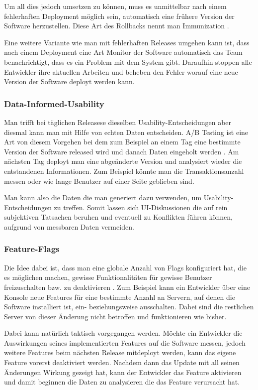 Um all dies jedoch umsetzen zu können, muss es unmittelbar nach einem fehlerhaften Deployment möglich sein, automatisch eine frühere Version der Software herzustellen. Diese Art des Rollbacks nennt man Immunization \cite{riesfivewhys08}.

Eine weitere Variante wie man mit fehlerhaften Releases umgehen kann ist, dass nach einem Deployment eine Art Monitor der Software automatisch das Team benachrichtigt, dass es ein Problem mit dem System gibt. Daraufhin stoppen alle Entwickler ihre aktuellen Arbeiten und beheben den Fehler worauf eine neue Version der Software deployt werden kann.

\subsubsection{Data-Informed-Usability}
Man trifft bei täglichen Releasese dieselben Usability-Ent\-schei\-dun\-gen aber diesmal kann man mit Hilfe von echten Daten entscheiden. A/B Testing ist eine Art von diesem Vorgehen bei dem zum Beispiel an einem Tag eine bestimmte Version der Software released wird und danach Daten eingeholt werden \cite{webanalytics2009}. Am nächsten Tag deployt man eine abgeänderte Version und analysiert wieder die entstandenen Informationen. Zum Beispiel könnte man die Transaktionsanzahl messen oder wie lange Benutzer auf einer Seite geblieben sind. 

Man kann also die Daten die man generiert dazu verwenden, um Usability-Ent\-schei\-dun\-gen zu treffen. Somit lassen sich UI-Diskussionen die auf rein subjektiven Tatsachen beruhen und eventuell zu Konflikten führen können, aufgrund von messbaren Daten vermeiden.

\subsubsection{Feature-Flags}
\label{minisec:featureflags}
Die Idee dabei ist, dass man eine globale Anzahl von Flags konfiguriert hat, die es möglichen machen, gewisse Funktionalitäten für gewisse Benutzer freizuschalten bzw. zu deaktivieren \cite{weboperations2010}. Zum Beispiel kann ein Entwickler über eine Konsole neue Features für eine bestimmte Anzahl an Servern, auf denen die Software installiert ist, ein- beziehungsweise ausschalten. Dabei sind die restlichen Server von dieser Änderung nicht betroffen und funktionieren wie bisher.

Dabei kann natürlich taktisch vorgegangen werden. Möchte ein Entwickler die Auswirkungen seines implementierten Features auf die Software messen, jedoch weitere Features beim nächsten Release mitdeployt werden, kann das eigene Feature vorerst deaktiviert werden. Nachdem dann das Update mit all seinen Änderungen Wirkung gezeigt hat, kann der Entwickler das Feature aktivieren und damit beginnen die Daten zu analysieren die das Feature verursacht hat. 


